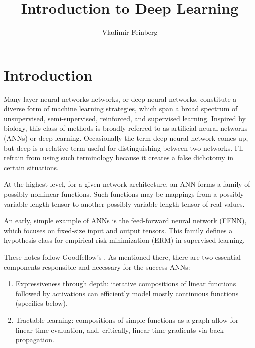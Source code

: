 \documentclass{article}
\title{Introduction to Deep Learning}
\author{Vladimir Feinberg}
\begin{document}
\maketitle

\section{Introduction}

Many-layer neural networks networks, or deep neural networks, constitute a diverse form of machine learning strategies, which span a broad spectrum of unsupervised, semi-supervised, reinforced, and supervised learning. Inspired by biology, this class of methods is broadly referred to as artificial neural networks (ANNs) or deep learning. Occasionally the term deep neural network comes up, but deep is a relative term useful for distinguishing between two networks. I'll refrain from using such terminology because it creates a false dichotomy in certain situations.

At the highest level, for a given network architecture, an ANN forms a family of possibly nonlinear functions. Such functions may be mappings from a possibly variable-length tensor to another possibly variable-length tensor of real values.

An early, simple example of ANNs is the feed-forward neural network (FFNN), which focuses on fixed-size input and output tensors. This family defines a hypothesis class for empirical risk minimization (ERM) in supervised learning.

These notes follow Goodfellow's . As mentioned there, there are two essential components responsible and necessary for the success ANNs:
\begin{enumerate}
\item Expressiveness through depth: iterative compositions of linear functions followed by activations can efficiently model mostly continuous functions (specifics below).
\item Tractable learning: compositions of simple functions as a graph allow for linear-time evaluation, and, critically, linear-time gradients via back-propagation.
\end{enumerate}
\end{document}
